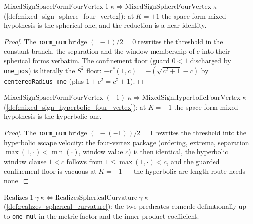 \begin{lemma}\leanok
[reduction at $K=+1$: to the spherical hypothesis]
  \label{lem:mixed_sign_sphere_of_spaceform}
  $\mathrm{MixedSignSpaceFormFourVertex}\;1\;\kappa\Longrightarrow
  \mathrm{MixedSignSphereFourVertex}\;\kappa$
  (\cref{def:mixed_sign_sphere_four_vertex}): at $K=+1$ the space-form
  mixed hypothesis is the spherical one, and the reduction is a near-identity.
\end{lemma}

\begin{proof}
  \leanok
  The \texttt{norm\_num} bridge $(1-1)/2=0$ rewrites the threshold in the
  constant branch, the separation and the window membership of $c$ into their
  spherical forms verbatim. The confinement floor (guard $0<1$ discharged by
  \texttt{one\_pos}) is literally the $S^2$ floor:
  $-r^\ast(1,c)=-(\sqrt{c^2+1}-c)$ by \texttt{centeredRadius\_one} (plus
  $1+c^2=c^2+1$).
\end{proof}

\begin{lemma}\leanok
[reduction at $K=-1$: to the hyperbolic hypothesis]
  \label{lem:mixed_sign_hyperbolic_of_spaceform}
  $\mathrm{MixedSignSpaceFormFourVertex}\;(-1)\;\kappa\Longrightarrow
  \mathrm{MixedSignHyperbolicFourVertex}\;\kappa$
  (\cref{def:mixed_sign_hyperbolic_four_vertex}): at $K=-1$ the
  space-form mixed hypothesis is the hyperbolic one.
\end{lemma}

\begin{proof}
  \leanok
  The \texttt{norm\_num} bridge $(1-(-1))/2=1$ rewrites the threshold into the
  hyperbolic escape velocity: the four-vertex package (ordering, extrema,
  separation $\max(1,\cdot)<\min(\cdot)$, window value $c$) is then identical,
  the hyperbolic window clause $1<c$ follows from $1\le\max(1,\cdot)<c$, and
  the guarded confinement floor is vacuous at $K=-1$ — the
  hyperbolic arc-length route needs none.
\end{proof}

\begin{lemma}\leanok
[realization at $K=+1$ is spherical realization]
  \label{lem:realizes_one_iff_spherical}
  $\mathrm{Realizes}\;1\;\gamma\;\kappa\iff
  \mathrm{RealizesSphericalCurvature}\;\gamma\;\kappa$
  (\cref{def:realizes_spherical_curvature}): the two predicates coincide
  definitionally up to \texttt{one\_mul} in the metric factor and the
  inner-product coefficient.
\end{lemma}

